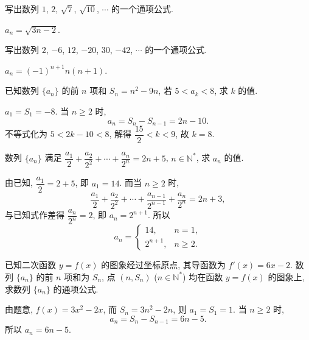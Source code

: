 \begin{exercise}
    写出数列 $1$, $2$, $\sqrt7$, $\sqrt{10}$, $\cdots$ 的一个通项公式.
\end{exercise}
\beginsolution
    $a_n=\sqrt{3n-2}$.
\endsolution

\begin{exercise}
    写出数列 $2$, $-6$, $12$, $-20$, $30$, $-42$, $\cdots$ 的一个通项公式.
\end{exercise}
\beginsolution
    $a_n= (-1)^{n+1} n(n+1)$.
\endsolution

\begin{exercise}
    已知数列 $\{a_n\}$ 的前 $n$ 项和 $S_n= n^2 -9n$, 若 $5<a_k <8$, 求 $k$ 的值.
\end{exercise}
\beginsolution
    $a_1= S_1= -8$. 当 $n\geqslant 2$ 时, 
    \[a_n= S_n-S_{n-1}= 2n-10.\]
    不等式化为 $5<2k-10<8$, 解得 $\dfrac{15}2< k< 9$, 故 $k=8$.
\endsolution

\begin{exercise}
    数列 $\{a_n\}$ 满足 $\dfrac{a_1}2+ \dfrac{a_2}{2^2}+\cdots+ \dfrac{a_n}{2^n} =2n+5$, $n\in\mathbb{N}^*$, 求 $a_n$ 的值.
\end{exercise}
\beginsolution
    由已知, $\dfrac{a_1}2= 2+5$, 即 $a_1=14$. 而当 $n\geqslant 2$ 时,
    \[\dfrac{a_1}2+ \dfrac{a_2}{2^2}+\cdots
    + \dfrac{a_{n-1}}{2^{n-1}}+ \dfrac{a_n}{2^n}=2n+3,\]
    与已知式作差得 $\dfrac{a_n}{2^n}= 2$, 即 $a_n= 2^{n+1}$. 所以
    \[a_n= \begin{cases}
        14, & n=1,\\
        2^{n+1}, & n\geqslant 2.
    \end{cases}\]
\endsolution

\begin{exercise}
    已知二次函数 $y=f(x)$ 的图象经过坐标原点, 其导函数为 $f'(x)=6x-2$. 
    数列 $\{a_n\}$ 的前 $n$ 项和为 $S_n$, 点 $(n,S_n)$ ($n\in\mathbb{N}^*$) 均在函数 $y=f(x)$ 的图象上, 求数列 $\{a_n\}$ 的通项公式.
\end{exercise}
\beginsolution
    由题意, $f(x)= 3x^2-2x$, 而 $S_n= 3n^2-2n$, 则 $a_1= S_1= 1$. 当 $n\geqslant 2$ 时, 
    \[a_n= S_n-S_{n-1}= 6n-5.\]
    所以 $a_n= 6n-5$.
\endsolution